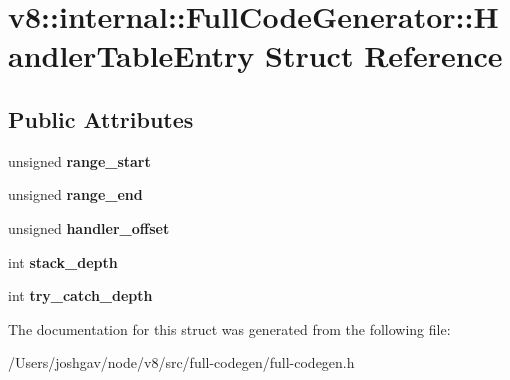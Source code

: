 \hypertarget{structv8_1_1internal_1_1_full_code_generator_1_1_handler_table_entry}{}\section{v8\+:\+:internal\+:\+:Full\+Code\+Generator\+:\+:Handler\+Table\+Entry Struct Reference}
\label{structv8_1_1internal_1_1_full_code_generator_1_1_handler_table_entry}
\subsection*{Public Attributes}
\begin{DoxyCompactItemize}
\item 
unsigned {\bfseries range\+\_\+start}\hypertarget{structv8_1_1internal_1_1_full_code_generator_1_1_handler_table_entry_aa2634de915d7d266c7bbaf558b4a74b7}{}\label{structv8_1_1internal_1_1_full_code_generator_1_1_handler_table_entry_aa2634de915d7d266c7bbaf558b4a74b7}

\item 
unsigned {\bfseries range\+\_\+end}\hypertarget{structv8_1_1internal_1_1_full_code_generator_1_1_handler_table_entry_a14bd83f1dbeab3da2653691c9932042b}{}\label{structv8_1_1internal_1_1_full_code_generator_1_1_handler_table_entry_a14bd83f1dbeab3da2653691c9932042b}

\item 
unsigned {\bfseries handler\+\_\+offset}\hypertarget{structv8_1_1internal_1_1_full_code_generator_1_1_handler_table_entry_ae1c0d97fc702941754166474849a04ed}{}\label{structv8_1_1internal_1_1_full_code_generator_1_1_handler_table_entry_ae1c0d97fc702941754166474849a04ed}

\item 
int {\bfseries stack\+\_\+depth}\hypertarget{structv8_1_1internal_1_1_full_code_generator_1_1_handler_table_entry_a4daa08d21da3bf46696b191acedd50cc}{}\label{structv8_1_1internal_1_1_full_code_generator_1_1_handler_table_entry_a4daa08d21da3bf46696b191acedd50cc}

\item 
int {\bfseries try\+\_\+catch\+\_\+depth}\hypertarget{structv8_1_1internal_1_1_full_code_generator_1_1_handler_table_entry_a9f9cccdb55952137677571d10d0471e3}{}\label{structv8_1_1internal_1_1_full_code_generator_1_1_handler_table_entry_a9f9cccdb55952137677571d10d0471e3}

\end{DoxyCompactItemize}


The documentation for this struct was generated from the following file\+:\begin{DoxyCompactItemize}
\item 
/\+Users/joshgav/node/v8/src/full-\/codegen/full-\/codegen.\+h\end{DoxyCompactItemize}
